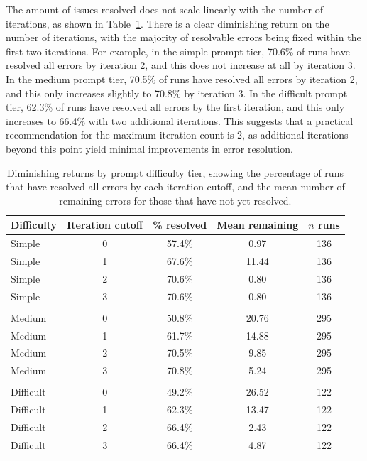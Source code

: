 The amount of issues resolved does not scale linearly with the number of iterations, as shown in Table~\ref{tab:iteration-cutoff-difficulty}. There is a clear diminishing return on the number of iterations, with the majority of resolvable errors being fixed within the first two iterations. For example, in the simple prompt tier, 70.6\% of runs have resolved all errors by iteration 2, and this does not increase at all by iteration 3. In the medium prompt tier, 70.5\% of runs have resolved all errors by iteration 2, and this only increases slightly to 70.8\% by iteration 3. In the difficult prompt tier, 62.3\% of runs have resolved all errors by the first iteration, and this only increases to 66.4\% with two additional iterations. This suggests that a practical recommendation for the maximum iteration count is 2, as additional iterations beyond this point yield minimal improvements in error resolution.

\begin{table}[H]
	\centering
	\begin{tabular}{lcccc}
		\toprule
		Difficulty & Iteration cutoff & \% resolved & Mean remaining & $n$ runs \\
		\midrule
		Simple     & 0                & 57.4\%      & 0.97           & 136      \\
		Simple     & 1                & 67.6\%      & 11.44          & 136      \\
		Simple     & 2                & 70.6\%      & 0.80           & 136      \\
		Simple     & 3                & 70.6\%      & 0.80           & 136      \\
		\\
		Medium     & 0                & 50.8\%      & 20.76          & 295      \\
		Medium     & 1                & 61.7\%      & 14.88          & 295      \\
		Medium     & 2                & 70.5\%      & 9.85           & 295      \\
		Medium     & 3                & 70.8\%      & 5.24           & 295      \\
		\\
		Difficult  & 0                & 49.2\%      & 26.52          & 122      \\
		Difficult  & 1                & 62.3\%      & 13.47          & 122      \\
		Difficult  & 2                & 66.4\%      & 2.43           & 122      \\
		Difficult  & 3                & 66.4\%      & 4.87           & 122      \\
		\bottomrule
	\end{tabular}
	\vspace{1em}
	\caption{Diminishing returns by prompt difficulty tier, showing the percentage of runs that have resolved all errors by each iteration cutoff, and the mean number of remaining errors for those that have not yet resolved.}
	\label{tab:iteration-cutoff-difficulty}
\end{table}
